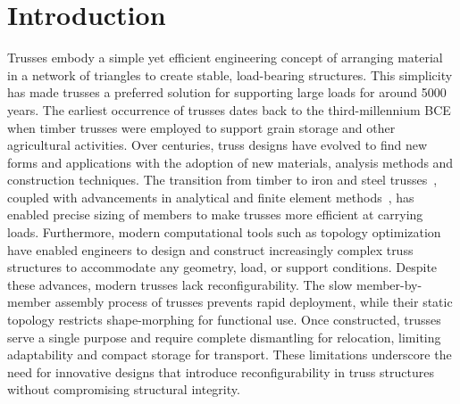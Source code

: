 \section{Introduction}\label{02-sec-truss-intro}
Trusses embody a simple yet efficient engineering concept of arranging material in a network of triangles to create stable, load-bearing structures. This simplicity has made trusses a preferred solution for supporting large loads for around 5000 years. The earliest occurrence of trusses dates back to the third-millennium BCE~\citep{farshad1978iranian} when timber trusses were employed to support grain storage and other agricultural activities. Over centuries, truss designs have evolved to find new forms and applications with the adoption of new materials, analysis methods and construction techniques. The transition from timber to iron and steel trusses~\citep{thorne2017structural, gasparini1989early}, coupled with advancements in analytical and finite element methods~\citep{hibbeler2006structural, turner1956stiffness, clough1960finite}, has enabled precise sizing of members to make trusses more efficient at carrying loads. Furthermore, modern computational tools such as topology optimization~\citep{stolpe2016truss} have enabled engineers to design and construct increasingly complex truss structures to accommodate any geometry, load, or support conditions. Despite these advances, modern trusses lack reconfigurability. The slow member-by-member assembly process of trusses prevents rapid deployment, while their static topology restricts shape-morphing for functional use. Once constructed, trusses serve a single purpose and require complete dismantling for relocation, limiting adaptability and compact storage for transport. These limitations underscore the need for innovative designs that introduce reconfigurability in truss structures without compromising structural integrity.

